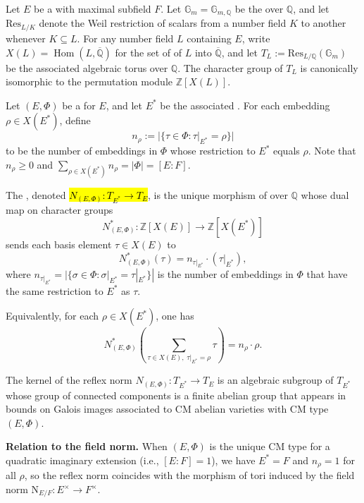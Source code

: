 \begin{definition} \label{definition:reflex_norm_for_a_cm_field}
    Let $E$ be a  with maximal  subfield $F$. Let $\mathbb{G}_m = \mathbb{G}_{m,\mathbb{Q}}$ be the  over $\mathbb{Q}$, and let $\mathrm{Res}_{L/K}$ denote the Weil restriction of scalars from a number field $K$ to another whenever $K \subseteq L$.
    For any number field $L$ containing $E$, write $X(L) = \operatorname{Hom}(L, \overline{\mathbb{Q}})$ for the set of  of $L$ into $\overline{\mathbb{Q}}$, and let $T_L := \mathrm{Res}_{L/\mathbb{Q}}(\mathbb{G}_m)$ be the associated algebraic torus over $\mathbb{Q}$. The character group of $T_L$ is canonically isomorphic to the permutation module $\mathbb{Z}[X(L)]$.

    Let $(E, \Phi)$ be a  for $E$, and let $E^*$ be the associated . For each embedding $\rho \in X(E^*)$, define
    $$n_\rho := |\{\tau \in \Phi : \tau|_{E^*} = \rho\}|$$
    to be the number of embeddings in $\Phi$ whose restriction to $E^*$ equals $\rho$. Note that $n_\rho \geq 0$ and $\sum_{\rho \in X(E^*)} n_\rho = |\Phi| = [E:F]$.

    The , denoted \hl{$N_{(E,\Phi)}: T_{E^*} \to T_E$}, is the unique morphism of  over $\mathbb{Q}$ whose dual map on character groups
    $$N_{(E,\Phi)}^*: \mathbb{Z}[X(E)] \to \mathbb{Z}[X(E^*)]$$
    sends each basis element $\tau \in X(E)$ to
    $$N_{(E,\Phi)}^*(\tau) = n_{\tau|_{E^*}} \cdot (\tau|_{E^*}),$$
    where $n_{\tau|_{E^*}} = |\{\sigma \in \Phi : \sigma|_{E^*} = \tau|_{E^*}\}|$ is the number of embeddings in $\Phi$ that have the same restriction to $E^*$ as $\tau$.

    Equivalently, for each $\rho \in X(E^*)$, one has
    $$N_{(E,\Phi)}^*\left(\sum_{\tau \in X(E),\; \tau|_{E^*} = \rho} \tau\right) = n_\rho \cdot \rho.$$

    The kernel of the reflex norm $N_{(E,\Phi)}: T_{E^*} \to T_E$ is an algebraic subgroup of $T_{E^*}$ whose group of connected components is a finite abelian group that appears in bounds on Galois images associated to CM abelian varieties with CM type $(E, \Phi)$.

    \textbf{Relation to the field norm.} When $(E, \Phi)$ is the unique CM type for a quadratic imaginary extension (i.e., $[E:F] = 1$), we have $E^* = F$ and $n_\rho = 1$ for all $\rho$, so the reflex norm coincides with the morphism of tori induced by the field norm $\mathrm{N}_{E/F}: E^\times \to F^\times$.
\end{definition}
